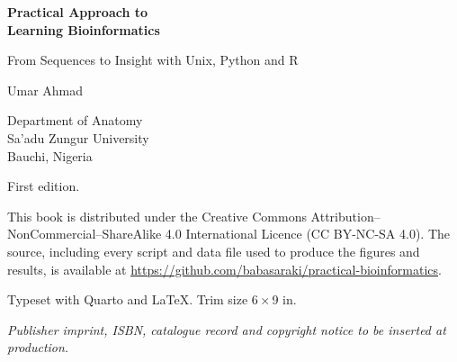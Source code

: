 \frontmatter
\pagestyle{empty}

\begin{center}
\vspace*{2cm}
{\Huge\bfseries Practical Approach to\\[4pt] Learning Bioinformatics\par}
\vspace{1cm}
{\Large From Sequences to Insight with Unix, Python and R\par}
\vspace{2cm}
{\large Umar Ahmad\par}
\vspace{0.5cm}
{\normalsize Department of Anatomy\\ Sa'adu Zungur University\\ Bauchi, Nigeria\par}
\vfill
\end{center}
\cleardoublepage

\thispagestyle{empty}
\null\vfill
\noindent\small
First edition.\par\medskip
\noindent This book is distributed under the Creative Commons
Attribution--NonCommercial--ShareAlike 4.0 International Licence (CC BY-NC-SA 4.0).
The source, including every script and data file used to produce the figures and
results, is available at \url{https://github.com/babasaraki/practical-bioinformatics}.
\par\medskip
\noindent Typeset with Quarto and \LaTeX{}. Trim size 6\,$\times$\,9 in.
\par\medskip
\noindent \emph{Publisher imprint, ISBN, catalogue record and copyright notice
to be inserted at production.}
\cleardoublepage
\pagestyle{scrheadings}
\mainmatter
